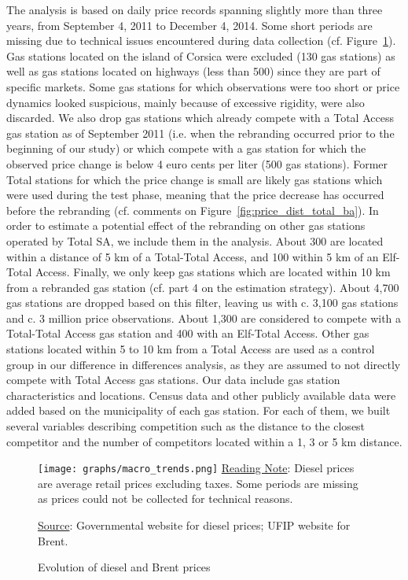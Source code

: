 \documentclass[english]{article}
\begin{document}
The analysis is based on daily price records spanning slightly more than three years, from September 4, 2011 to December 4, 2014. Some short periods are missing due to technical issues encountered during data collection (cf. Figure~\ref{fig:diesel_and_brent}). Gas stations located on the island of Corsica were excluded (130 gas stations) as well as gas stations located on highways (less than 500) since they are part of specific markets. Some gas stations for which observations were too short or price dynamics looked suspicious, mainly because of excessive rigidity, were also discarded. We also drop gas stations which already compete with a Total Access gas station as of September 2011 (i.e. when the rebranding occurred prior to the beginning of our study) or which compete with a gas station for which the observed price change is below 4 euro cents per liter (500 gas stations). Former Total stations for which the price change is small are likely gas stations which were used during the test phase, meaning that the price decrease has occurred before the rebranding (cf. comments on Figure~\ref{fig:price_dist_total_ba}). In order to estimate a potential effect of the rebranding on other gas stations operated by Total SA, we include them in the analysis. About 300 are located within a distance of 5 km of a Total-Total Access, and 100 within 5 km of an Elf-Total Access. Finally, we only keep gas stations which are located within 10 km from a rebranded gas station (cf. part 4 on the estimation strategy). About 4,700 gas stations are dropped based on this filter, leaving us with c. 3,100 gas stations and c. 3 million price observations. About 1,300 are considered to compete with a Total-Total Access gas station and 400 with an Elf-Total Access. Other gas stations located within 5 to 10 km from a Total Access are used as a control group in our difference in differences analysis, as they are assumed to not directly compete with Total Access gas stations. Our data include gas station characteristics and locations. Census data and other publicly available data were added based on the municipality of each gas station. For each of them, we built several variables describing competition such as the distance to the closest competitor and the number of competitors located within a 1, 3 or 5 km distance.
\medskip{}

\begin{figure}[H]
    \caption{Evolution of diesel and Brent prices}
		\label{fig:diesel_and_brent}
\texttt{[image: graphs/macro\_trends.png]}
\flushleft
{\small{}\uline{Reading Note}}{\small{}:
Diesel prices are average retail prices excluding taxes. Some periods are missing as prices could not be collected for technical reasons.}{\small \par}
{\small{}\uline{Source}}{\small{}: Governmental website for diesel prices; UFIP website for Brent.}\medskip{}
\end{figure}
\end{document}
